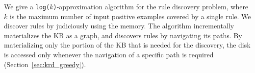 We give a \texttt{log($k$)}-approximation algorithm for the rule discovery problem, %
where $k$ is the maximum number of input positive examples covered by a single rule. We discover rules by judiciously using the memory. The algorithm incrementally 
materializes the KB as a graph, and discovers rules by navigating its paths. 
By materializing only the portion of the KB that is needed for the discovery, 
the disk is accessed only whenever the navigation of a specific path is required (Section~\ref{sec:krd_greedy}). 



